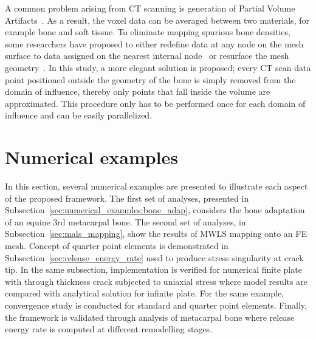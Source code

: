 \documentclass[11pt]{acmeArticle}
\numberwithin{equation}{section}
\begin{document}
A common problem arising from CT scanning is generation of Partial Volume Artifacts~\citep{adams2009quantitative}. As a result, the voxel data can be averaged between two materials, for example bone and soft tissue.
To eliminate mapping spurious bone densities, some researchers have proposed to either redefine data at any node on the mesh surface to data assigned on the nearest internal node~\citep{helgason2008modified, chen2010new} or resurface the mesh geometry~\citep{peleg2014can}. 
In this study, a more elegant solution is proposed; every CT scan data point positioned outside the geometry of the bone is simply removed from the domain of influence, thereby only points that fall inside the volume are approximated. 
This procedure only has to be performed once for each domain of influence  and can be easily parallelized. %


\section{Numerical examples}
\label{sec:numerical_examples}
In this section, several numerical examples are presented to illustrate each aspect of the proposed framework. 
The first set of analyses, presented in Subsection~\ref{sec:numerical_examples:bone_adap}, considers the bone adaptation of an equine 3rd metacarpal bone. 
The second set of analyses, in Subsection~\ref{sec:mals_mapping}, show the results of MWLS mapping onto an FE mesh. 
Concept of quarter point elements is demonstrated in Subsection~\ref{sec:release_energy_rate} used to produce stress singularity at crack tip.
In the same subsection, implementation is verified for numerical finite plate with through thickness crack subjected to uniaxial stress where model results are compared with analytical solution for infinite plate. 
For the same example, convergence study is conducted for standard and quarter point elements.
Finally, the framework is validated through analysis of metacarpal bone where release energy rate is computed at different remodelling stages.
\end{document}
